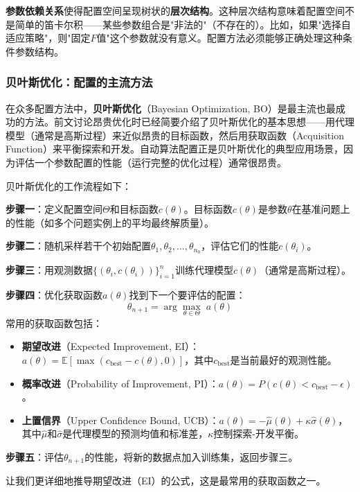 \documentclass[lang=cn,zihao=-4,a4paper,fontset=windows]{beautybook}
\begin{document}
\textbf{参数依赖关系}使得配置空间呈现树状的\textbf{层次结构}。这种层次结构意味着配置空间不是简单的笛卡尔积——某些参数组合是"非法的"（不存在的）。比如，如果"选择自适应策略"，则"固定$F$值"这个参数就没有意义。配置方法必须能够正确处理这种条件参数结构。

\subsubsection{贝叶斯优化：配置的主流方法}

在众多配置方法中，\textbf{贝叶斯优化}（Bayesian Optimization, BO）是最主流也最成功的方法。前文讨论昂贵优化时已经简要介绍了贝叶斯优化的基本思想——用代理模型（通常是高斯过程）来近似昂贵的目标函数，然后用获取函数（Acquisition Function）来平衡探索和开发。自动算法配置正是贝叶斯优化的典型应用场景，因为评估一个参数配置的性能（运行完整的优化过程）通常很昂贵。

贝叶斯优化的工作流程如下：

\textbf{步骤一}：定义配置空间$\Theta$和目标函数$c(\theta)$。目标函数$c(\theta)$是参数$\theta$在基准问题上的性能（如多个问题实例上的平均最终解质量）。

\textbf{步骤二}：随机采样若干个初始配置$\theta_1, \theta_2, \dots, \theta_{n_0}$，评估它们的性能$c(\theta_i)$。

\textbf{步骤三}：用观测数据$\{(\theta_i, c(\theta_i))\}_{i=1}^{n}$训练代理模型$\hat{c}(\theta)$（通常是高斯过程）。

\textbf{步骤四}：优化获取函数$a(\theta)$找到下一个要评估的配置：
\[
\theta_{n+1} = \arg\max_{\theta \in \Theta} \; a(\theta)
\]
常用的获取函数包括：
\begin{itemize}
    \item \textbf{期望改进}（Expected Improvement, EI）：$a(\theta) = \mathbb{E}\left[ \max(c_{\text{best}} - c(\theta), 0) \right]$，其中$c_{\text{best}}$是当前最好的观测性能。
    \item \textbf{概率改进}（Probability of Improvement, PI）：$a(\theta) = P(c(\theta) < c_{\text{best}} - \epsilon)$。
    \item \textbf{上置信界}（Upper Confidence Bound, UCB）：$a(\theta) = -\hat{\mu}(\theta) + \kappa \hat{\sigma}(\theta)$，其中$\hat{\mu}$和$\hat{\sigma}$是代理模型的预测均值和标准差，$\kappa$控制探索-开发平衡。
\end{itemize}

\textbf{步骤五}：评估$\theta_{n+1}$的性能，将新的数据点加入训练集，返回步骤三。

让我们更详细地推导期望改进（EI）的公式，这是最常用的获取函数之一。
\end{document}
